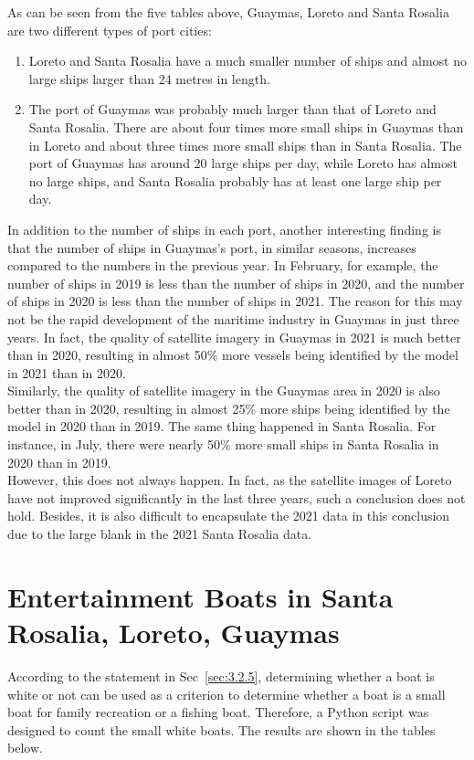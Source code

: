 As can be seen from the five tables above, Guaymas, Loreto and Santa Rosalia are two different types of port cities:

\begin{enumerate}
    \item Loreto and Santa Rosalia have a much smaller number of ships and almost no large ships larger than 24 metres in length.
    \item The port of Guaymas was probably much larger than that of Loreto and Santa Rosalia. There are about four times more small ships in Guaymas than in Loreto and about three times more small ships than in Santa Rosalia. The port of Guaymas has around 20 large ships per day, while Loreto has almost no large ships, and Santa Rosalia probably has at least one large ship per day.
\end{enumerate}

In addition to the number of ships in each port, another interesting finding is that the number of ships in Guaymas's port, in similar seasons, increases compared to the numbers in the previous year. In February, for example, the number of ships in 2019 is less than the number of ships in 2020, and the number of ships in 2020 is less than the number of ships in 2021. The reason for this may not be the rapid development of the maritime industry in Guaymas in just three years. In fact, the quality of satellite imagery in Guaymas in 2021 is much better than in 2020, resulting in almost 50\% more vessels being identified by the model in 2021 than in 2020. \\

Similarly, the quality of satellite imagery in the Guaymas area in 2020 is also better than in 2020, resulting in almost 25\% more ships being identified by the model in 2020 than in 2019. The same thing happened in Santa Rosalia. For instance, in July, there were nearly 50\% more small ships in Santa Rosalia in 2020 than in 2019. \\

However, this does not always happen. In fact, as the satellite images of Loreto have not improved significantly in the last three years, such a conclusion does not hold. Besides, it is also difficult to encapsulate the 2021 data in this conclusion due to the large blank in the 2021 Santa Rosalia data.



\section{Entertainment Boats in Santa Rosalia, Loreto, Guaymas}
According to the statement in Sec~\ref{sec:3.2.5}, determining whether a boat is white or not can be used as a criterion to determine whether a boat is a small boat for family recreation or a fishing boat. Therefore, a Python script was designed to count the small white boats. The results are shown in the tables below.\\



